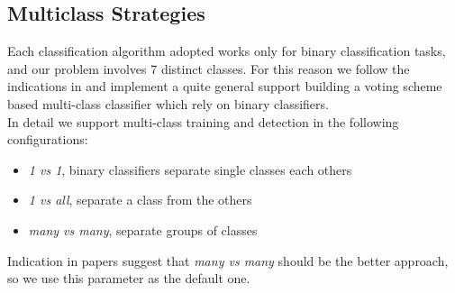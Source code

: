 \subsection{Multiclass Strategies}

Each classification algorithm adopted works only for binary classification tasks, and our problem involves 7 distinct classes. For this reason we follow the indications in \cite{Littlewort04dynamicsof, Bartlett06fullyautomatic} and implement a quite general support building a voting scheme based multi-class classifier which rely on binary classifiers.\\
In detail we support multi-class training and detection in the following configurations:

\begin{itemize}
\item \emph{1 vs 1}, binary classifiers separate single classes each others
\item \emph{1 vs all}, separate a class from the others
\item \emph{many vs many}, separate groups of classes
\end{itemize}

Indication in papers suggest that \emph{many vs many} should be the better approach, so we use this parameter as the default one.

